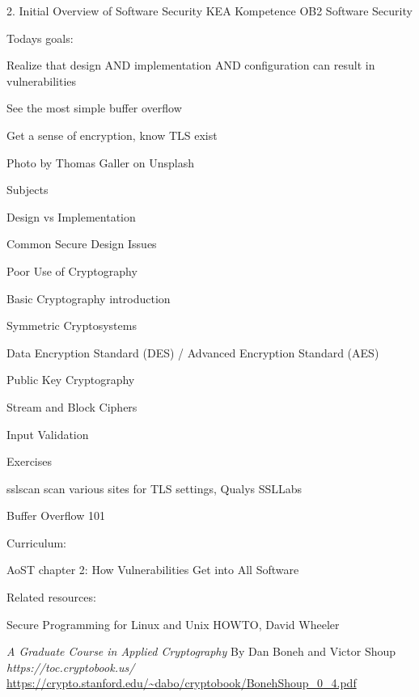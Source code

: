 \documentclass[Screen16to9,17pt]{foils}
\begin{document}
\mytitlepage
{2. Initial Overview of Software Security}
{KEA Kompetence OB2 Software Security}



Todays goals:
\begin{list2}
\item Realize that design AND implementation AND configuration can result in vulnerabilities
\item See the most simple buffer overflow
\item Get a sense of encryption, know TLS exist
\end{list2}

  Photo by Thomas Galler on Unsplash



\begin{list1}
\item Subjects
\begin{list2}
\item Design vs Implementation
\item Common  Secure Design Issues
\item Poor Use of Cryptography
\item Basic Cryptography introduction
\item Symmetric Cryptosystems
\item Data Encryption Standard (DES) / Advanced Encryption Standard (AES)
\item Public Key Cryptography
\item Stream and Block Ciphers
\item Input Validation
\end{list2}
\item Exercises
\begin{list2}
\item sslscan scan various sites for TLS settings, Qualys SSLLabs
\item Buffer Overflow 101
\end{list2}
\end{list1}



Curriculum:
\begin{list1}
\item AoST chapter 2: How Vulnerabilities Get into All Software
\end{list1}

Related resources:
\begin{list1}
\item Secure Programming for Linux and Unix HOWTO, David Wheeler
\item {}
\item \emph{A Graduate Course in Applied Cryptography} By Dan Boneh and Victor Shoup \emph{https://toc.cryptobook.us/} \url{https://crypto.stanford.edu/~dabo/cryptobook/BonehShoup_0_4.pdf}
\end{list1}
\end{document}
